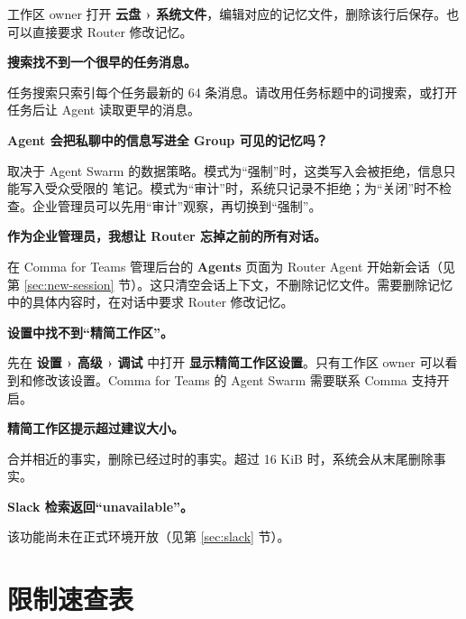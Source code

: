 \documentclass[UTF8,a4paper,11pt]{ctexart}
\begin{document}
工作区 owner 打开 \textbf{云盘 › 系统文件}，编辑对应的记忆文件，删除该行后保存。也可以直接要求 Router 修改记忆。

\textbf{搜索找不到一个很早的任务消息。}

任务搜索只索引每个任务最新的 64 条消息。请改用任务标题中的词搜索，或打开任务后让 Agent 读取更早的消息。

\textbf{Agent 会把私聊中的信息写进全 Group 可见的记忆吗？}

取决于 Agent Swarm 的数据策略。模式为“强制”时，这类写入会被拒绝，信息只能写入受众受限的  笔记。模式为“审计”时，系统只记录不拒绝；为“关闭”时不检查。企业管理员可以先用“审计”观察，再切换到“强制”。

\textbf{作为企业管理员，我想让 Router 忘掉之前的所有对话。}

在 Comma for Teams 管理后台的 \textbf{Agents} 页面为 Router Agent 开始新会话（见第 \ref{sec:new-session} 节）。这只清空会话上下文，不删除记忆文件。需要删除记忆中的具体内容时，在对话中要求 Router 修改记忆。

\textbf{设置中找不到“精简工作区”。}

先在 \textbf{设置 › 高级 › 调试} 中打开 \textbf{显示精简工作区设置}。只有工作区 owner 可以看到和修改该设置。Comma for Teams 的 Agent Swarm 需要联系 Comma 支持开启。

\textbf{精简工作区提示超过建议大小。}

合并相近的事实，删除已经过时的事实。超过 16 KiB 时，系统会从末尾删除事实。

\textbf{Slack 检索返回“unavailable”。}

该功能尚未在正式环境开放（见第 \ref{sec:slack} 节）。

\section{限制速查表}
\end{document}

